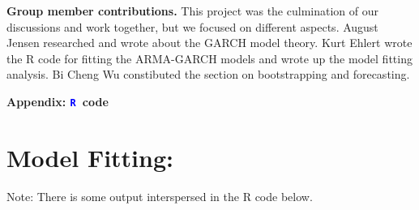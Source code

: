 \documentclass[12pt]{article}
\newcommand{\textR}[1]{\textcolor{blue}{\texttt{#1}}}
\newcommand{\R}{\textR{R}}
\begin{document}
\textbf{Group member contributions.} This project was the culmination of our discussions and work together, but we focused on different aspects. August Jensen researched and wrote about the GARCH model theory. Kurt Ehlert wrote the R code for fitting the ARMA-GARCH models and wrote up the model fitting analysis. Bi Cheng Wu constibuted the section on bootstrapping and forecasting.

\newpage

\appendix
\begin{center}
{\Large {\bf Appendix: \R\ code}}
\end{center}

\section{Model Fitting:}
Note: There is some output interspersed in the R code below.
\end{document}
